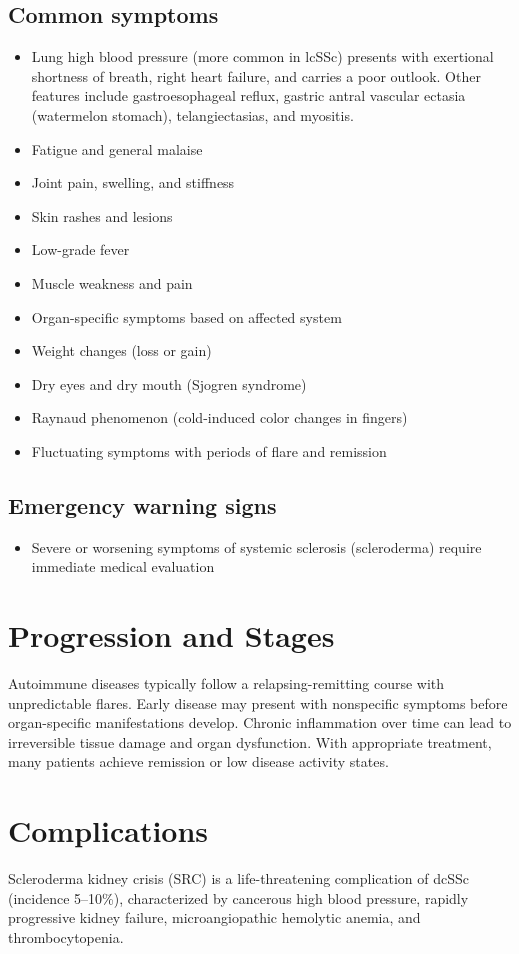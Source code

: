 \subsection{Common symptoms}
\begin{itemize}[noitemsep]
  \item Lung high blood pressure (more common in lcSSc) presents with exertional shortness of breath, right heart failure, and carries a poor outlook. Other features include gastroesophageal reflux, gastric antral vascular ectasia (watermelon stomach), telangiectasias, and myositis.
  \item Fatigue and general malaise
  \item Joint pain, swelling, and stiffness
  \item Skin rashes and lesions
  \item Low-grade fever
  \item Muscle weakness and pain
  \item Organ-specific symptoms based on affected system
  \item Weight changes (loss or gain)
  \item Dry eyes and dry mouth (Sjogren syndrome)
  \item Raynaud phenomenon (cold-induced color changes in fingers)
  \item Fluctuating symptoms with periods of flare and remission
\end{itemize}

\subsection{Emergency warning signs}
\begin{itemize}[noitemsep]
  \item Severe or worsening symptoms of systemic sclerosis (scleroderma) require immediate medical evaluation
\end{itemize}
\section{Progression and Stages}
Autoimmune diseases typically follow a relapsing-remitting course with unpredictable flares. Early disease may present with nonspecific symptoms before organ-specific manifestations develop. Chronic inflammation over time can lead to irreversible tissue damage and organ dysfunction. With appropriate treatment, many patients achieve remission or low disease activity states.
\section{Complications}
Scleroderma kidney crisis (SRC) is a life-threatening complication of dcSSc (incidence 5--10\%), characterized by cancerous high blood pressure, rapidly progressive kidney failure, microangiopathic hemolytic anemia, and thrombocytopenia.

